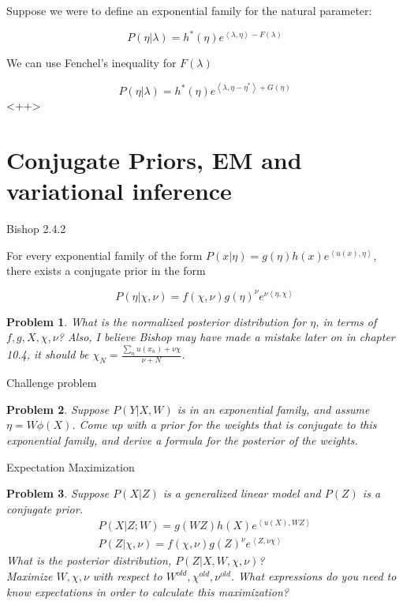 \documentclass[a4paper]{article}
\newtheorem{problem}{Problem}[section]
\begin{document}
Suppose we were to define an exponential family for the natural parameter:

\begin{equation}
  P( \eta \vert \lambda ) = h^*(\eta) e^{ \left< \lambda, \eta \right> - F(\lambda) }
  \label{}
\end{equation}

We can use Fenchel's inequality for $F(\lambda)$

\begin{equation}
  P( \eta \vert \lambda ) = h^*(\eta) e^{ \left< \lambda, \eta - \eta^* \right> + G(\eta) }
  \label{<++>}
\end{equation}<++>

\section{Conjugate Priors, EM and variational inference}

Bishop 2.4.2

For every exponential family of the form $P( x \vert \eta) = g(\eta) h(x) e^{ \left< u(x), \eta \right>}$, there exists a conjugate prior in the form

\begin{equation}
  P( \eta \vert \chi, \nu) = f( \chi, \nu) g(\eta)^\nu e^{ \nu \left< \eta, \chi \right> }
  \label{conjugate prior}
\end{equation}

\begin{problem}
  What is the normalized posterior distribution for $\eta$, in terms of $f,g,X,\chi,\nu$?  Also, I believe Bishop may have made a mistake later on in chapter 10.4, it should be $\chi_N = \frac{ \sum_n u(x_n) + \nu \chi}{\nu + N }$.
\end{problem}

Challenge problem
\begin{problem}
  Suppose $P(Y \vert X, W)$ is in an exponential family, and assume $\eta = W \phi(X)$.  Come up with a prior for the weights that is conjugate to this exponential family, and derive a formula for the posterior of the weights.
\end{problem}

Expectation Maximization
\begin{problem}
  Suppose $P(X \vert Z)$ is a generalized linear model and $P(Z)$ is a conjugate prior.
\begin{equation}
  \begin{split}
    P( X \vert Z; W) = g( W Z ) h(X) e^{\left< u(X), W Z \right> } \\
    P( Z \vert \chi, \nu) = f(\chi,\nu) g(Z)^\nu e^{\left< Z, \nu \chi \right> }
  \end{split}
  \label{}
\end{equation}
What is the posterior distribution, $P(Z \vert X, W, \chi, \nu)$?  \\
Maximize $W,\chi,\nu$ with respect to $W^{old},\chi^{old},\nu^{old}$.  What expressions do you need to know expectations in order to calculate this maximization?
\end{problem}
\end{document}
